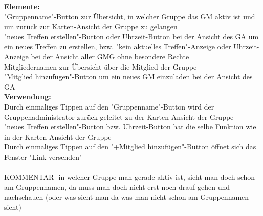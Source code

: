\textbf{Elemente:}\\
"Gruppenname"-Button zur Übersicht, in welcher Gruppe das GM aktiv ist und um zurück zur Karten-Ansicht der Gruppe zu gelangen\\
"neues Treffen erstellen"-Button oder Uhrzeit-Button bei der Ansicht des GA um ein neues Treffen zu erstellen, bzw. "kein aktuelles Treffen"-Anzeige oder Uhrzeit-Anzeige bei der Ansicht aller GMG ohne besondere Rechte\\
Mitgliedernamen zur Übersicht über die Mitglied der Gruppe\\
"Mitglied hinzufügen"-Button um ein neues GM einzuladen bei der Ansicht des GA\\
\textbf{Verwendung:}\\
Durch einmaliges Tippen auf den "Gruppenname"-Button wird der Gruppenadministrator zurück geleitet zu der Karten-Ansicht der Gruppe\\
"neues Treffen erstellen"-Button bzw. Uhrzeit-Button hat die selbe Funktion wie in der Karten-Ansicht der Gruppe\\
Durch einmaliges Tippen auf den "+Mitglied hinzufügen"-Button öffnet sich das Fenster "Link versenden"\\ \\

KOMMENTAR
-in welcher Gruppe man gerade aktiv ist, sieht man doch schon am Gruppennamen, da muss man doch nicht erst noch drauf gehen und nachschauen (oder was sieht man da was man nicht schon am Gruppennamen sieht)


